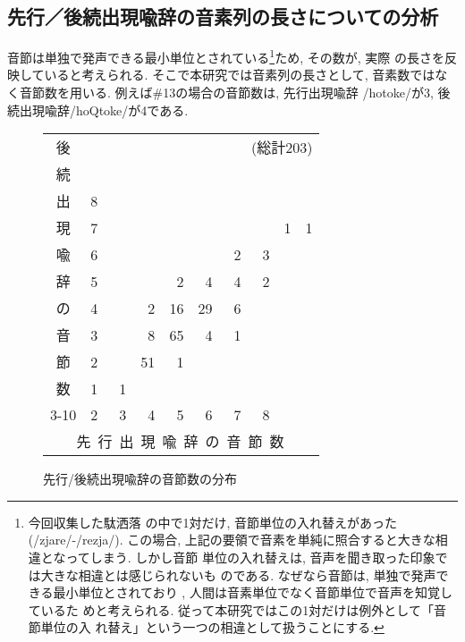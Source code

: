 \subsection{先行／後続出現喩辞の音素列の長さについての分析}\label{onso-length}

音節は単独で発声できる最小単位とされている\footnote{今回収集した駄洒落
の中で1対だけ, 音節単位の入れ替えがあった(/zjare/-/rezja/). この場合, 
上記の要領で音素を単純に照合すると大きな相違となってしまう. しかし音節
単位の入れ替えは, 音声を聞き取った印象では大きな相違とは感じられないも
のである. なぜなら音節は, 単独で発声できる最小単位とされており
\cite{JIPDEC1992}, 人間は音素単位でなく音節単位で音声を知覚しているた
めと考えられる. 従って本研究ではこの1対だけは例外として「音節単位の入
れ替え」という一つの相違として扱うことにする.  }ため, その数が, 実際 
の長さを反映していると考えられる. そこで本研究では音素列の長さとして, 
音素数ではなく音節数を用いる. 例えば\#13の場合の音節数は, 先行出現喩辞
/hotoke/が3, 後続出現喩辞/hoQtoke/が4である. 

\begin{figure}
\begin{center}
\begin{tabular}{cc|rrrrrrrr}
後 &&&&&&\multicolumn{4}{r}{(総計203)}\vspace*{-0.2em}\\
続 &&&&&&&&&\vspace*{-0.2em}\\
出 & 8 &&&&&&&&\vspace*{-0.2em}\\
現 & 7 &&&&&&& 1 & 1 \vspace*{-0.2em}\\
喩 & 6 &&&&& 2 & 3 &&\vspace*{-0.2em}\\
辞 & 5 &&& 2 & 4 & 4 & 2 &&\vspace*{-0.2em}\\
の & 4 && 2 & 16 & 29 & 6 &&&\vspace*{-0.2em}\\
音 & 3 && 8 & 65 & 4 & 1 &&&\vspace*{-0.2em}\\
節 & 2 && 51 & 1 &&&&&\vspace*{-0.2em}\\
数 & 1 & \ 1 &&&&&&&\vspace*{-0.2em}\\\cline{3-10}
\multicolumn{3}{r}{1} & 2 & 3 & 4 & \ 5 & \ 6 & \ 7 & \ 8\vspace*{-0.2em}\\
\multicolumn{10}{r}{先\ 行\ 出\ 現\ 喩\ 辞\ の\ 音\ 節\ 数\ \ \ \ }\vspace*{-0.1em}\\
\end{tabular}
\caption{先行/後続出現喩辞の音節数の分布}\label{onsetu-dist}
\end{center}
\end{figure}

